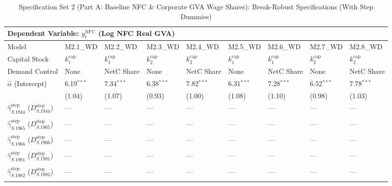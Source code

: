 \begin{table}[H]
\centering
\caption{Specification Set 2 (Part A: Baseline NFC \& Corporate GVA Wage Shares): Break-Robust Specifications (With Step Dummies)}
\label{tab:spec_set_2_a_wd}
\scriptsize
\begin{tabular}{p{3.8cm}p{1.35cm}p{1.35cm}p{1.35cm}p{1.35cm}p{1.35cm}p{1.35cm}p{1.35cm}p{1.35cm}}
\toprule
\multicolumn{9}{l}{\textbf{Dependent Variable: $y_t^{\text{NFC}}$ (Log NFC Real GVA)}} \\
\midrule
Model & M2.1\_WD & M2.2\_WD & M2.3\_WD & M2.4\_WD & M2.5\_WD & M2.6\_WD & M2.7\_WD & M2.8\_WD  \\
Capital Stock & $k^{\text{cap}}_1$ & $k^{\text{cap}}_1$ & $k^{\text{cap}}_2$ & $k^{\text{cap}}_2$ & $k^{\text{cap}}_1$ & $k^{\text{cap}}_1$ & $k^{\text{cap}}_2$ & $k^{\text{cap}}_2$  \\
Demand Control & None & NetC Share & None & NetC Share & None & NetC Share & None & NetC Share  \\
\midrule
$\hat{\alpha}$ (Intercept)  & 6.19$^{***}$ & 7.34$^{***}$ & 6.38$^{***}$ & 7.82$^{***}$ & 6.31$^{***}$ & 7.28$^{***}$ & 6.52$^{***}$ & 7.78$^{***}$  \\
 & {\scriptsize (1.04)} & {\scriptsize (1.07)} & {\scriptsize (0.93)} & {\scriptsize (1.00)} & {\scriptsize (1.08)} & {\scriptsize (1.10)} & {\scriptsize (0.98)} & {\scriptsize (1.03)}  \\
$\hat{\gamma}^{\text{step}}_{S.1944}$ ($D^{\text{step}}_{S.1944}$)  & --- & --- & --- & --- & --- & --- & --- & ---  \\
 &  &  &  &  &  &  &  &   \\
$\hat{\gamma}^{\text{step}}_{S.1965}$ ($D^{\text{step}}_{S.1965}$)  & --- & --- & --- & --- & --- & --- & --- & ---  \\
 &  &  &  &  &  &  &  &   \\
$\hat{\gamma}^{\text{step}}_{S.1966}$ ($D^{\text{step}}_{S.1966}$)  & --- & --- & --- & --- & --- & --- & --- & ---  \\
 &  &  &  &  &  &  &  &   \\
$\hat{\gamma}^{\text{step}}_{S.1981}$ ($D^{\text{step}}_{S.1981}$)  & --- & --- & --- & --- & --- & --- & --- & ---  \\
 &  &  &  &  &  &  &  &   \\
$\hat{\gamma}^{\text{step}}_{S.1982}$ ($D^{\text{step}}_{S.1982}$)  & --- & --- & --- & --- & --- & --- & --- & ---  \\
 &  &  &  &  &  &  &  &   \\

\end{tabular}
\end{table}
